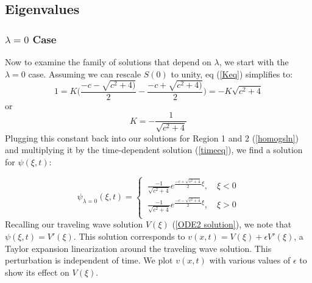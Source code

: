 \documentclass[12pt]{article}
\begin{document}
\subsection{Eigenvalues}
\subsubsection{$\lambda = 0$ Case}
Now to examine the family of solutions that depend on $\lambda$, we start with the $\lambda = 0$ case. Assuming we can rescale $S(0)$ to unity, eq (\ref{Keq}) simplifies to:
$$1 = K\Bigg(\frac{-c-\sqrt{c^2+4)}}{2} - \frac{-c+\sqrt{c^2+4)}}{2}\Bigg) = -K\sqrt{c^2+4} $$
or
$$K = -\frac{1}{\sqrt{c^2+4}}$$
Plugging this constant back into our solutions for Region 1 and 2 (\ref{homogsln}) and multiplying it by the time-dependent solution (\ref{timeeq}), we find a solution for $\psi(\xi,t)$:

\begin{equation}\label{solnlambda0}
\psi_{\lambda=0}(\xi,t)=
\begin{cases}
\ \frac{-1}{\sqrt{c^2+4}}e^{\frac{-c+\sqrt{c^2+4}}{2}\xi},\quad \xi < 0 \\
\ \frac{-1}{\sqrt{c^2+4}}e^{\frac{-c-\sqrt{c^2+4}}{2}\xi},\quad \xi > 0\\
\end{cases}
\end{equation}
Recalling our traveling wave solution $V(\xi)$ (\ref{ODE2 solution}), we note that $\psi(\xi,t) = V'(\xi)$. This solution corresponds to $v(x,t) = V(\xi) + \epsilon V'(\xi)$, a Taylor expansion linearization around the traveling wave solution. This perturbation is independent of time. We plot $v(x,t)$ with various values of $\epsilon$ to show its effect on $V(\xi)$.
\end{document}
